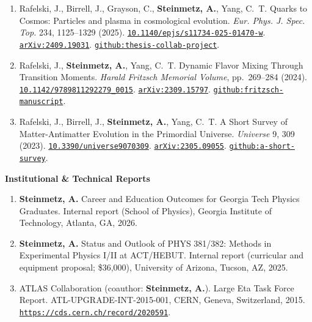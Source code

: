 \documentclass[11pt]{article}
\begin{document}
\begin{enumerate}[leftmargin=*,nosep]
    \item Rafelski, J., Birrell, J., Grayson, C., \textbf{Steinmetz, A.}, Yang, C.~T. Quarks to Cosmos: Particles and plasma in cosmological evolution. \textit{Eur. Phys. J. Spec. Top.} 234, 1125--1329 (2025). \href{https://doi.org/10.1140/epjs/s11734-025-01470-w}{\nolinkurl{10.1140/epjs/s11734-025-01470-w}}. \href{https://arxiv.org/abs/2409.19031}{\nolinkurl{arXiv:2409.19031}}. \href{https://github.com/ajsteinmetz/thesis-collab-project}{\nolinkurl{github:thesis-collab-project}}.
    \item Rafelski, J., \textbf{Steinmetz, A.}, Yang, C.~T. Dynamic Flavor Mixing Through Transition Moments. \textit{Harald Fritzsch Memorial Volume}, pp.~269--284 (2024). \href{https://doi.org/10.1142/9789811292279_0015}{\nolinkurl{10.1142/9789811292279_0015}}. \href{https://arxiv.org/abs/2309.15797}{\nolinkurl{arXiv:2309.15797}}. \href{https://github.com/ajsteinmetz/fritzsch-manuscript}{\nolinkurl{github:fritzsch-manuscript}}.
    \item Rafelski, J., Birrell, J., \textbf{Steinmetz, A.}, Yang, C.~T. A Short Survey of Matter-Antimatter Evolution in the Primordial Universe. \textit{Universe} 9, 309 (2023). \href{https://doi.org/10.3390/universe9070309}{\nolinkurl{10.3390/universe9070309}}. \href{https://arxiv.org/abs/2305.09055}{\nolinkurl{arXiv:2305.09055}}. \href{https://github.com/ajsteinmetz/a-short-survey}{\nolinkurl{github:a-short-survey}}.
\end{enumerate}

\medskip

{\large\textbf{Institutional \& Technical Reports}}

\begin{enumerate}[leftmargin=*,nosep]
    \item \textbf{Steinmetz, A.} Career and Education Outcomes for Georgia Tech Physics Graduates. Internal report (School of Physics), Georgia Institute of Technology, Atlanta, GA, 2026.
    \item \textbf{Steinmetz, A.} Status and Outlook of PHYS 381/382: Methods in Experimental Physics I/II at ACT\slash HEBUT. Internal report (curricular and equipment proposal; \$36,000), University of Arizona, Tucson, AZ, 2025.
    \item ATLAS Collaboration (coauthor: \textbf{Steinmetz, A.}). Large Eta Task Force Report. ATL-UPGRADE-INT-2015-001, CERN, Geneva, Switzerland, 2015. \href{https://cds.cern.ch/record/2020591}{\nolinkurl{https://cds.cern.ch/record/2020591}}.
\end{enumerate}
\end{document}
